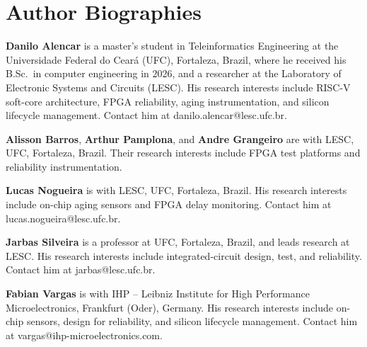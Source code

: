 \documentclass[10pt,twocolumn]{article}
\begin{document}
\section*{Author Biographies}
\footnotesize
\noindent\textbf{Danilo Alencar} is a master's student in Teleinformatics Engineering at the Universidade Federal do Cear\'a (UFC), Fortaleza, Brazil, where he received his B.Sc.\ in computer engineering in 2026, and a researcher at the Laboratory of Electronic Systems and Circuits (LESC). His research interests include RISC-V soft-core architecture, FPGA reliability, aging instrumentation, and silicon lifecycle management. Contact him at danilo.alencar@lesc.ufc.br.

\smallskip\noindent\textbf{Alisson Barros}, \textbf{Arthur Pamplona}, and \textbf{Andre Grangeiro} are with LESC, UFC, Fortaleza, Brazil. Their research interests include FPGA test platforms and reliability instrumentation.

\smallskip\noindent\textbf{Lucas Nogueira} is with LESC, UFC, Fortaleza, Brazil. His research interests include on-chip aging sensors and FPGA delay monitoring. Contact him at lucas.nogueira@lesc.ufc.br.

\smallskip\noindent\textbf{Jarbas Silveira} is a professor at UFC, Fortaleza, Brazil, and leads research at LESC. His research interests include integrated-circuit design, test, and reliability. Contact him at jarbas@lesc.ufc.br.

\smallskip\noindent\textbf{Fabian Vargas} is with IHP -- Leibniz Institute for High Performance Microelectronics, Frankfurt (Oder), Germany. His research interests include on-chip sensors, design for reliability, and silicon lifecycle management. Contact him at vargas@ihp-microelectronics.com.
\end{document}
